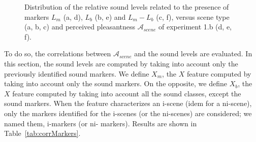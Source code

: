 \documentclass[12pt]{elsarticle}
\newcommand{\cf}{cf.}
\begin{document}
\begin{figure}[t]
        \caption{Distribution of the relative sound levels related to the presence of markers $L_m$ (a, d), $L_b$ (b, e) and $L_m-L_b$ (c, f), versus scene type (a, b, c) and perceived pleasantness $\mathcal{A}_{scene}$ of experiment 1.b (d, e, f).}\label{fig:soundlevelMarker}
\end{figure}


To do so, the correlations between $\mathcal{A}_{scene}$ and the sound levels are evaluated. In this section, the sound levels are computed by taking into account only the previously identified sound markers. We define $X_m$, the $X$ feature computed by taking into account only the sound markers. On the opposite, we define $X_b$, the $X$ feature computed by taking into account all the sound classes, except the sound markers. When the feature characterizes an i-scene (idem for a ni-scene),  only the markers identified for the i-scenes (or the ni-scenes) are considered; we named them, i-markers (or ni- markers). Results are shown in Table~\ref{tab:corrMarkers}.

\end{document}
